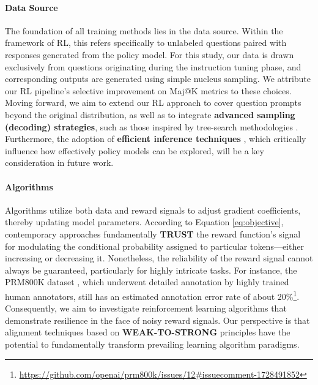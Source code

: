 \begin{itemize}[topsep=0pt]
\begin{itemize}[topsep=0pt]
\paragraph{Data Source} The foundation of all training methods lies in the data source. Within the framework of RL, this refers specifically to unlabeled questions paired with responses generated from the policy model. For this study, our data is drawn exclusively from questions originating during the instruction tuning phase, and corresponding outputs are generated using simple nucleus sampling. We attribute our RL pipeline's selective improvement on Maj@K metrics to these choices. Moving forward, we aim to extend our RL approach to cover question prompts beyond the original distribution, as well as to integrate \textbf{advanced sampling (decoding) strategies}, such as those inspired by tree-search methodologies \citep{yao2023tree}. Furthermore, the adoption of \textbf{efficient inference techniques} \citep{xia-etal-2023-speculative,leviathan2023fast,kwon2023efficient,xia2024unlocking}, which critically influence how effectively policy models can be explored, will be a key consideration in future work.

\paragraph{Algorithms} Algorithms utilize both data and reward signals to adjust gradient coefficients, thereby updating model parameters. According to Equation \ref{eq:objective}, contemporary approaches fundamentally \textbf{TRUST} the reward function’s signal for modulating the conditional probability assigned to particular tokens—either increasing or decreasing it. Nonetheless, the reliability of the reward signal cannot always be guaranteed, particularly for highly intricate tasks. For instance, the PRM800K dataset \citep{lightman2023let}, which underwent detailed annotation by highly trained human annotators, still has an estimated annotation error rate of about 20\%\footnote{\url{https://github.com/openai/prm800k/issues/12\#issuecomment-1728491852}}. Consequently, we aim to investigate reinforcement learning algorithms that demonstrate resilience in the face of noisy reward signals. Our perspective is that alignment techniques based on \textbf{WEAK-TO-STRONG} \citep{burns2023weak} principles have the potential to fundamentally transform prevailing learning algorithm paradigms.


\end{itemize}
\end{itemize}
